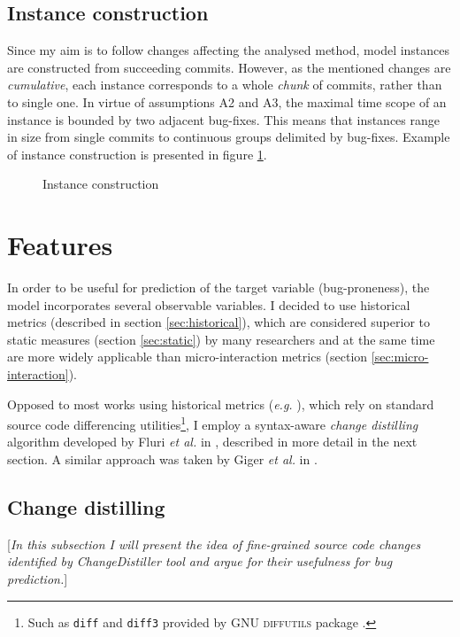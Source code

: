 \documentclass{pracamgr}
\begin{document}
\subsection{Instance construction}
\label{sec:instance_construction}

Since my aim is to follow changes affecting the analysed method, model instances are constructed from succeeding commits. However, as the mentioned changes are \emph{cumulative}, each instance corresponds to a whole \emph{chunk} of commits, rather than to single one. In virtue of assumptions A2 and A3, the maximal time scope of an instance is bounded by two adjacent bug-fixes. This means that instances range in size from single commits to continuous groups delimited by bug-fixes. Example of instance construction is presented in figure \ref{fig:instance_construction}.

\begin{figure}[h]
\centering

\caption{Instance construction}
\label{fig:instance_construction}
\end{figure}

\section{Features}
\label{sec:features}
In order to be useful for prediction of the target variable (bug-proneness), the model incorporates several observable variables. I decided to use historical metrics (described in section \ref{sec:historical}), which are considered superior to static measures (section \ref{sec:static}) by many researchers \cite{merits, comparative, how_and_why} and at the same time are more widely applicable than micro-interaction metrics (section \ref{sec:micro-interaction}).

Opposed to most works using historical metrics (\textit{e.g.} \cite{systematic, merits, micro_interaction, comparative, how_and_why}), which rely on standard source code differencing utilities\footnote{Such as \texttt{diff} and \texttt{diff3} provided by \textsc{GNU diffutils} package \cite{diffutils}.}, I employ a syntax-aware \emph{change distilling} algorithm developed by Fluri \textit{et al.} in \cite{change_distilling}, described in more detail in the next section. A similar approach was taken by Giger \textit{et al.} in \cite{method-level}.

\subsection{Change distilling}
\label{sec:change_distilling}
[\textit{In this subsection I will present the idea of fine-grained source code changes identified by ChangeDistiller tool and argue for their usefulness for bug prediction.}]
\end{document}
